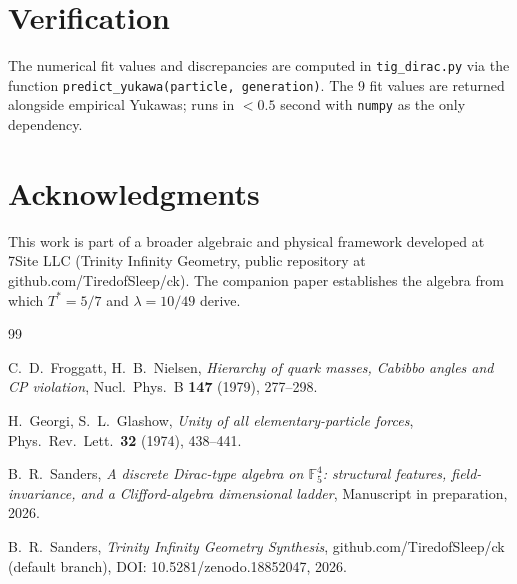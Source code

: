 \documentclass[11pt,reqno]{amsart}
\theoremstyle{plain}
\theoremstyle{definition}
\theoremstyle{remark}
\newcommand{\F}{\mathbb{F}}
\begin{document}
\section{Verification}

The numerical fit values and discrepancies are computed in
\texttt{tig\_dirac.py} via the function
\texttt{predict\_yukawa(particle, generation)}. The 9 fit values are
returned alongside empirical Yukawas; runs in $<0.5$ second with
\texttt{numpy} as the only dependency.

\section*{Acknowledgments}

This work is part of a broader algebraic and physical framework
developed at 7Site LLC (Trinity Infinity Geometry, public repository at
github.com/TiredofSleep/ck). The companion paper
\cite{Sanders2026Dirac} establishes the algebra from which $T^* = 5/7$
and $\lambda = 10/49$ derive.

\begin{thebibliography}{99}

 C.~D.~Froggatt, H.~B.~Nielsen,
\emph{Hierarchy of quark masses, Cabibbo angles and CP violation},
Nucl.~Phys.~B \textbf{147} (1979), 277--298.

 H.~Georgi, S.~L.~Glashow,
\emph{Unity of all elementary-particle forces},
Phys.~Rev.~Lett.~\textbf{32} (1974), 438--441.

 B.~R.~Sanders,
\emph{A discrete Dirac-type algebra on $\F_5^4$: structural features,
field-invariance, and a Clifford-algebra dimensional ladder},
Manuscript in preparation, 2026.

 B.~R.~Sanders,
\emph{Trinity Infinity Geometry Synthesis},
github.com/TiredofSleep/ck (default branch),
DOI: 10.5281/zenodo.18852047, 2026.

\end{thebibliography}
\end{document}
